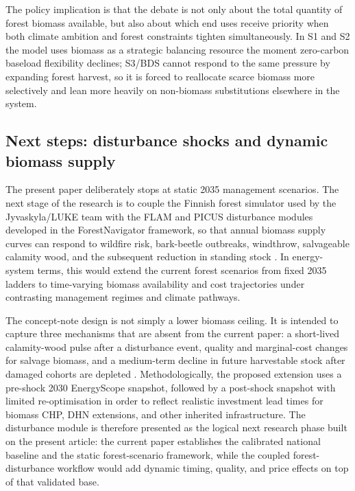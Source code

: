 \documentclass{article}
\begin{document}
The policy implication is that the debate is not only about the total quantity of forest biomass available, but also about which end uses receive priority when both climate ambition and forest constraints tighten simultaneously. In S1 and S2 the model uses biomass as a strategic balancing resource the moment zero-carbon baseload flexibility declines; S3/BDS cannot respond to the same pressure by expanding forest harvest, so it is forced to reallocate scarce biomass more selectively and lean more heavily on non-biomass substitutions elsewhere in the system.

\subsection{Next steps: disturbance shocks and dynamic biomass supply}

The present paper deliberately stops at static 2035 management scenarios. The next stage of the research is to couple the Finnish forest simulator used by the Jyvaskyla/LUKE team with the FLAM and PICUS disturbance modules developed in the ForestNavigator framework, so that annual biomass supply curves can respond to wildfire risk, bark-beetle outbreaks, windthrow, salvageable calamity wood, and the subsequent reduction in standing stock \citep{venalainenClimateChangeInduces2020,hlasnyDevastatingOutbreakBark2021,tothImpactsCalamityLogging2020}. In energy-system terms, this would extend the current forest scenarios from fixed 2035 ladders to time-varying biomass availability and cost trajectories under contrasting management regimes and climate pathways.

The concept-note design is not simply a lower biomass ceiling. It is intended to capture three mechanisms that are absent from the current paper: a short-lived calamity-wood pulse after a disturbance event, quality and marginal-cost changes for salvage biomass, and a medium-term decline in future harvestable stock after damaged cohorts are depleted \citep{tothImpactsCalamityLogging2020,reckaRoleBiomassDecarbonisation2023}. Methodologically, the proposed extension uses a pre-shock 2030 EnergyScope snapshot, followed by a post-shock snapshot with limited re-optimisation in order to reflect realistic investment lead times for biomass CHP, DHN extensions, and other inherited infrastructure. The disturbance module is therefore presented as the logical next research phase built on the present article: the current paper establishes the calibrated national baseline and the static forest-scenario framework, while the coupled forest-disturbance workflow would add dynamic timing, quality, and price effects on top of that validated base.
\end{document}
